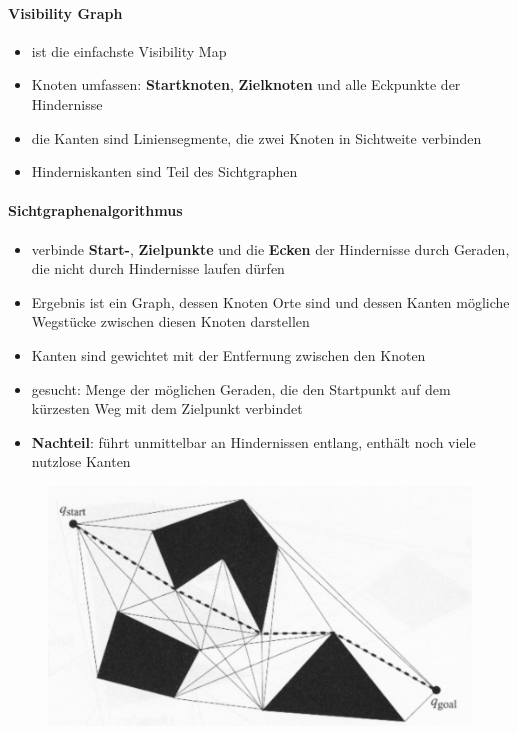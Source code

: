 \paragraph{Visibility Graph}
\begin{itemize}
	\item ist die einfachste Visibility Map
	\item Knoten umfassen: \textbf{Startknoten}, \textbf{Zielknoten} und alle Eckpunkte der Hindernisse
	\item die Kanten sind Liniensegmente, die zwei Knoten in Sichtweite verbinden
	\item Hinderniskanten sind Teil des Sichtgraphen
\end{itemize}
\newpage
\paragraph{Sichtgraphenalgorithmus}
\begin{itemize}
	\item verbinde \textbf{Start-}, \textbf{Zielpunkte} und die \textbf{Ecken} der Hindernisse durch Geraden, die nicht durch Hindernisse laufen dürfen
	\item Ergebnis ist ein Graph, dessen Knoten Orte sind und dessen Kanten mögliche Wegstücke zwischen diesen Knoten darstellen
	\item Kanten sind gewichtet mit der Entfernung zwischen den Knoten
	\item gesucht: Menge der möglichen Geraden, die den Startpunkt auf dem kürzesten Weg mit dem Zielpunkt verbindet
	\item \textbf{Nachteil}: führt unmittelbar an Hindernissen entlang, enthält noch viele nutzlose Kanten
\end{itemize}
\begin{figure}[H]
	\begin{center}
		\includegraphics[scale=0.5]{Resources/PNG/Sichtgraphalgorithmus.PNG}
		\caption{}
		\label{fig:PNG/Sichtgraphalgorithmus.PNG}
	\end{center}
\end{figure}
\newpage
